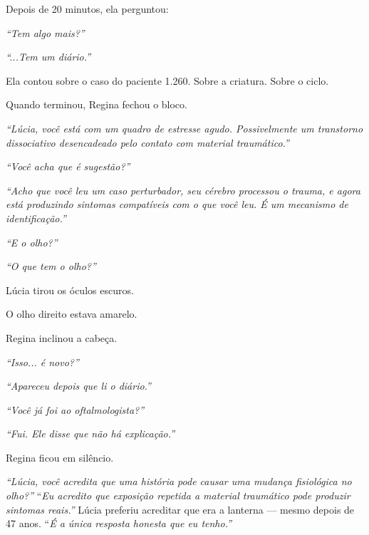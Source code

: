 \noindent Depois de 20 minutos, ela perguntou:

\noindent \textit{\textquotedblleft{}Tem algo mais?\textquotedblright{}}

\noindent \textit{\textquotedblleft{}...Tem um diário.\textquotedblright{}}

\noindent Ela contou sobre o caso do paciente 1.260. Sobre a criatura. Sobre o ciclo.

\noindent Quando terminou, Regina fechou o bloco.

\noindent \textit{\textquotedblleft{}Lúcia, você está com um quadro de estresse agudo. Possivelmente um transtorno dissociativo desencadeado pelo contato com material traumático.\textquotedblright{}}

\noindent \textit{\textquotedblleft{}Você acha que é sugestão?\textquotedblright{}}

\noindent \textit{\textquotedblleft{}Acho que você leu um caso perturbador, seu cérebro processou o trauma, e agora está produzindo sintomas compatíveis com o que você leu. É um mecanismo de identificação.\textquotedblright{}}

\noindent \textit{\textquotedblleft{}E o olho?\textquotedblright{}}

\noindent \textit{\textquotedblleft{}O que tem o olho?\textquotedblright{}}

\noindent Lúcia tirou os óculos escuros.

\noindent O olho direito estava amarelo.

\noindent Regina inclinou a cabeça.

\noindent \textit{\textquotedblleft{}Isso... é novo?\textquotedblright{}}

\noindent \textit{\textquotedblleft{}Apareceu depois que li o diário.\textquotedblright{}}

\noindent \textit{\textquotedblleft{}Você já foi ao oftalmologista?\textquotedblright{}}

\noindent \textit{\textquotedblleft{}Fui. Ele disse que não há explicação.\textquotedblright{}}

\noindent Regina ficou em silêncio.

\noindent \textit{\textquotedblleft{}Lúcia, você acredita que uma história pode causar uma mudança fisiológica no olho?\textquotedblright{}}
\noindent \textquotedblleft{\textit{Eu acredito que exposição repetida a material traumático pode produzir sintomas reais.\textquotedblright{}}}
\noindent Lúcia preferiu acreditar que era a lanterna --- mesmo depois de 47 anos.
\noindent \textquotedblleft{\textit{É a única resposta honesta que eu tenho.\textquotedblright{}}}

